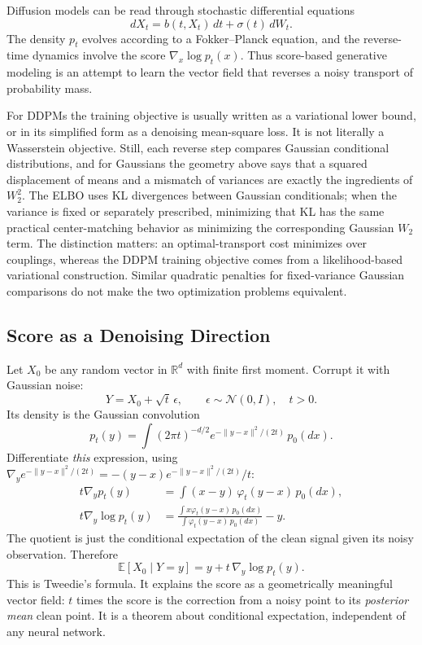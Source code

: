 Diffusion models can be read through stochastic differential equations
\[
  dX_t=b(t,X_t)\,dt+\sigma(t)\,dW_t.
\]
The density $p_t$ evolves according to a Fokker--Planck equation, and the reverse-time dynamics involve the score $\nabla_x\log p_t(x)$.  Thus score-based generative modeling is an attempt to learn the vector field that reverses a noisy transport of probability mass.

For DDPMs the training objective is usually written as a variational lower bound, or in its simplified form as a denoising mean-square loss.  It is not literally a Wasserstein objective.  Still, each reverse step compares Gaussian conditional distributions, and for Gaussians the geometry above says that a squared displacement of means and a mismatch of variances are exactly the ingredients of \(W_2^2\).  The ELBO uses KL divergences between Gaussian conditionals; when the variance is fixed or separately prescribed, minimizing that KL has the same practical center-matching behavior as minimizing the corresponding Gaussian \(W_2\) term.  The distinction matters: an optimal-transport cost minimizes over couplings, whereas the DDPM training objective comes from a likelihood-based variational construction. Similar quadratic penalties for fixed-variance Gaussian comparisons do not make the two optimization problems equivalent.

\subsection*{Score as a Denoising Direction}

Let $X_0$ be any random vector in $\mathbb R^d$ with finite first moment. Corrupt it with Gaussian noise:
\[
 Y=X_0+\sqrt t\,\epsilon,\qquad
 \epsilon\sim\mathcal N(0,I),\quad t>0.
\]
Its density is the Gaussian convolution
\[
 p_t(y)=\int (2\pi t)^{-d/2}
    e^{-\|y-x\|^2/(2t)}\,p_0(dx).
\]
Differentiate \emph{this} expression, using
$\nabla_y e^{-\|y-x\|^2/(2t)}
=-(y-x)e^{-\|y-x\|^2/(2t)}/t$:
\[
\begin{aligned}
 t\nabla_y p_t(y)
 &=\int(x-y)\,\varphi_t(y-x)\,p_0(dx),\\
 t\nabla_y\log p_t(y)
 &=\frac{\int x\varphi_t(y-x)\,p_0(dx)}
         {\int\varphi_t(y-x)\,p_0(dx)}-y.
\end{aligned}
\]
The quotient is just the conditional expectation of the clean signal given its noisy observation. Therefore
\[
 \boxed{\mathbb E[X_0\mid Y=y]
       =y+t\,\nabla_y\log p_t(y).}
\]
This is Tweedie's formula. It explains the score as a geometrically meaningful vector field: $t$ times the score is the correction from a noisy point to its \emph{posterior mean} clean point. It is a theorem about conditional expectation, independent of any neural network.

